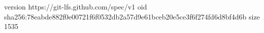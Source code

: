 version https://git-lfs.github.com/spec/v1
oid sha256:78eabde882f0e00721f6f0532db2a57d9e61bceb20e5ce3f6f274fd6d8bf4d6b
size 1535

